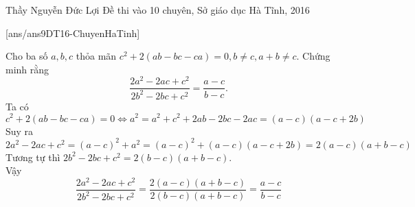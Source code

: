 \begin{name}
{Thầy  Nguyễn Đức Lợi}
{Đề thi vào 10 chuyên, Sở giáo dục Hà Tĩnh, 2016}
\end{name}
\setcounter{ex}{0}
[ans/ans9DT16-ChuyenHaTinh]
\setlength{\abovedisplayskip}{1pt}
\setlength{\belowdisplayskip}{1pt}
\begin{ex}%
   Cho ba số $a,b,c$ thỏa mãn $c^2+2(ab-bc-ca)=0, b\ne c, a+b \ne c$. Chứng minh rằng 
  $$\dfrac{2a^2-2ac+c^2}{2b^2-2bc+c^2}=\dfrac{a-c}{b-c}.$$
\loigiai
    {Ta có 
    $$c^2+2(ab-bc-ca)=0 \Leftrightarrow a^2=a^2+c^2+2ab-2bc-2ac=(a-c)(a-c+2b)$$
    Suy ra 
    $$2a^2-2ac+c^2=(a-c)^2+a^2=(a-c)^2+(a-c)(a-c+2b)=2(a-c)(a+b-c)$$
    Tương tự thì $2b^2-2bc+c^2=2(b-c)(a+b-c)$.\\
   Vậy 
   $$\dfrac{2a^2-2ac+c^2}{2b^2-2bc+c^2}=\dfrac{2(a-c)(a+b-c)}{2(b-c)(a+b-c)}=\dfrac{a-c}{b-c}$$
    }
\end{ex}


